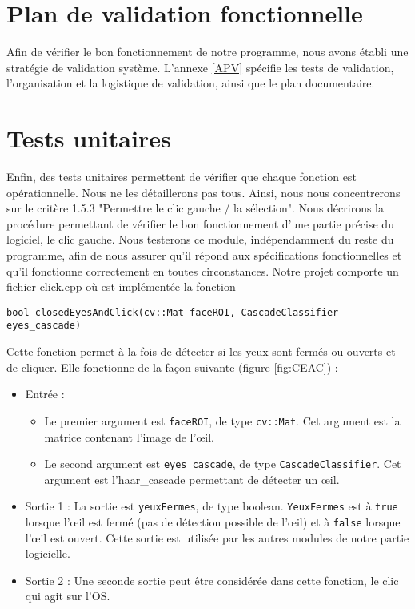 \section{Plan de validation fonctionnelle}

Afin de vérifier le bon fonctionnement de notre programme, nous avons établi une stratégie de validation système. L'annexe \ref{APV} spécifie les tests de validation, l'organisation et la logistique de validation, ainsi que le plan documentaire. 

\section{Tests unitaires}

Enfin, des tests unitaires permettent de vérifier que chaque fonction est opérationnelle. Nous ne les détaillerons pas tous. Ainsi, nous nous concentrerons sur le critère 1.5.3 "Permettre le clic gauche / la sélection". Nous décrirons la procédure permettant de vérifier le bon fonctionnement d’une partie précise du logiciel, le clic gauche. Nous testerons ce module, indépendamment du reste du programme, afin de nous assurer qu’il répond aux spécifications fonctionnelles et qu’il fonctionne correctement en toutes circonstances.
Notre projet comporte un fichier click.cpp où est implémentée la fonction
\begin{lstlisting}
bool closedEyesAndClick(cv::Mat faceROI, CascadeClassifier eyes_cascade)
\end{lstlisting}

Cette fonction permet à la fois de détecter si les yeux sont fermés ou ouverts et de cliquer. Elle fonctionne de la façon suivante (figure \ref{fig:CEAC}) :
\begin{itemize}[font=\tiny, label=]
\item Entrée :
\begin{itemize}[font=\tiny, label=]
\item Le premier argument est \lstinline=faceROI=, de type \lstinline=cv::Mat=. Cet argument est la matrice contenant l’image de l’œil.
\item Le second argument est \lstinline=eyes_cascade=, de type \lstinline=CascadeClassifier=. Cet argument est l’haar\_cascade permettant de détecter un œil.
\end{itemize}
\item  Sortie 1 : La sortie est \lstinline=yeuxFermes=, de type boolean. \lstinline=YeuxFermes= est à \lstinline=true= lorsque l’œil est fermé (pas de détection possible de l’œil) et à \lstinline=false= lorsque l’œil est ouvert. Cette sortie est utilisée par les autres modules de notre partie logicielle.
\item Sortie 2 : Une seconde sortie peut être considérée dans cette fonction, le clic qui agit sur l’OS.
\end{itemize}

